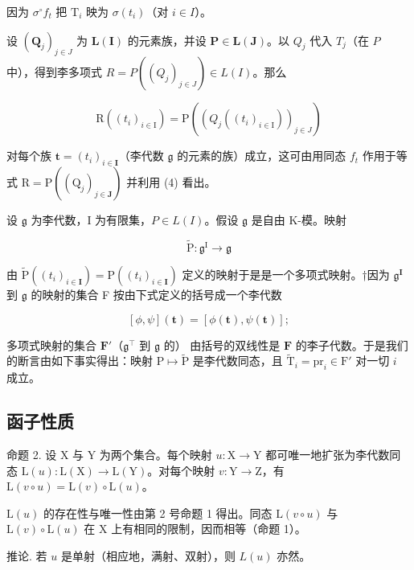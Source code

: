 因为 \(\sigma^{\circ}f_{t}\) 把 \(\mathrm{T}_i\) 映为 \(\sigma(t_i)\)（对 \(i\in I\)）。

设 \((\mathbf{Q}_j)_{j\in J}\) 为 \(\mathbf{L}(\mathbf{I})\) 的元素族，并设 \(\mathbf{P}\in \mathbf{L}(\mathbf{J})\)。以 \(Q_{j}\) 代入 \(T_{j}\)（在 \(P\) 中），得到李多项式 \(R = P((Q_{j})_{j \in J}) \in L(I)\)。那么

\[
\mathrm{R} ((t _ {i}) _ {i \in \mathrm{I}}) = \mathrm{P} ((Q _ {j} ((t _ {i}) _ {i \in \mathrm{I}})) _ {j \in J})\tag{5}
\]

对每个族 \(\pmb{t} = (t_i)_{i\in \mathbf{I}}\)（李代数 \(\mathfrak{g}\) 的元素的族）成立，这可由用同态 \(f_{t}\) 作用于等式 \(\mathrm{R} = \mathrm{P}((\mathrm{Q}_j)_{j\in \mathbf{J}})\) 并利用 (4) 看出。

设 \(\mathfrak{g}\) 为李代数，I 为有限集，\(P \in L(I)\)。假设 \(\mathfrak{g}\) 是自由 K-模。映射

\[
\tilde {\mathrm{P}} \colon \mathfrak {g} ^ {\mathrm{I}} \to \mathfrak {g}
\]

由 \(\tilde{\mathrm{P}}((t_i)_{i\in \mathbf{I}}) = \mathrm{P}((t_i)_{i\in \mathbf{I}})\) 定义的映射于是是一个多项式映射。†因为 \(\mathfrak{g}^{\mathbf{I}}\) 到 \(\mathfrak{g}\) 的映射的集合 F 按由下式定义的括号成一个李代数

\[
[ \phi , \psi ] (\boldsymbol {t}) = [ \phi (\boldsymbol {t}), \psi (\boldsymbol {t}) ];\tag{6}
\]

多项式映射的集合 \(\mathbf{F}'\)（\(\mathfrak{g}^{\intercal}\) 到 \(\mathfrak{g}\) 的） 由括号的双线性是 \(\mathbf{F}\) 的李子代数。于是我们的断言由如下事实得出：映射 \(\mathrm{P} \mapsto \tilde{\mathrm{P}}\) 是李代数同态，且 \(\tilde{\mathrm{T}}_i = \mathrm{pr}_i \in \mathrm{F}'\) 对一切 \(i\) 成立。

\subsection{函子性质}

命题 2. 设 X 与 Y 为两个集合。每个映射 \(u: \mathrm{X} \to \mathrm{Y}\) 都可唯一地扩张为李代数同态 \(\mathrm{L}(u): \mathrm{L}(\mathrm{X}) \to \mathrm{L}(\mathrm{Y})\)。对每个映射 \(v: \mathrm{Y} \to \mathrm{Z}\)，有 \(\mathrm{L}(v \circ u) = \mathrm{L}(v) \circ \mathrm{L}(u)\)。

\(\mathrm{L}(u)\) 的存在性与唯一性由第 2 号命题 1 得出。同态 \(\mathrm{L}(v\circ u)\) 与 \(\mathrm{L}(v)\circ \mathrm{L}(u)\) 在 X 上有相同的限制，因而相等（命题 1）。

推论. 若 \(u\) 是单射（相应地，满射、双射），则 \(L(u)\) 亦然。

